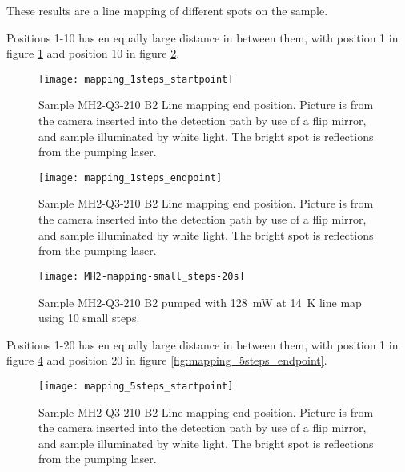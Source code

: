 These results are a line mapping of different spots on the sample.

Positions 1-10 has en equally large distance in between them, with position 1 in figure \ref{fig:mapping_1steps_startpoint} and position 10 in figure \ref{fig:mapping_1steps_endpoint}.

\begin{figure}[H]
\centering
\texttt{[image: mapping\_1steps\_startpoint]}
\caption[MH2-Q3-210 line mapping start position]{Sample MH2-Q3-210 B2 Line mapping end position. Picture is from the camera inserted into the detection path by use of a flip mirror, and sample illuminated by white light. The bright spot is reflections from the pumping laser.}
\label{fig:mapping_1steps_startpoint}%
\end{figure}


\begin{figure}[H]
\centering
\texttt{[image: mapping\_1steps\_endpoint]}
\caption[MH2-Q3-210 line mapping end position]{Sample MH2-Q3-210 B2 Line mapping end position. Picture is from the camera inserted into the detection path by use of a flip mirror, and sample illuminated by white light. The bright spot is reflections from the pumping laser.}
\label{fig:mapping_1steps_endpoint}%
\end{figure}

\begin{figure}[H]
\centering
\texttt{[image: MH2-mapping-small\_steps-20s]}
\caption[MH2-Q3-210 line mapping]{Sample MH2-Q3-210 B2 pumped with 128~mW at 14~K line map using 10 small steps.}
\label{fig:MH2-mapping-small_steps-20s}%
\end{figure}



Positions 1-20 has en equally large distance in between them, with position 1 in figure \ref{fig:mapping_5steps_startpoint} and position 20 in figure \ref{fig:mapping_5steps_endpoint}.

\begin{figure}[H]
\centering
\texttt{[image: mapping\_5steps\_startpoint]}
\caption[MH2-Q3-210 line mapping start position]{Sample MH2-Q3-210 B2 Line mapping end position. Picture is from the camera inserted into the detection path by use of a flip mirror, and sample illuminated by white light. The bright spot is reflections from the pumping laser.}
\label{fig:mapping_5steps_startpoint}%
\end{figure}


